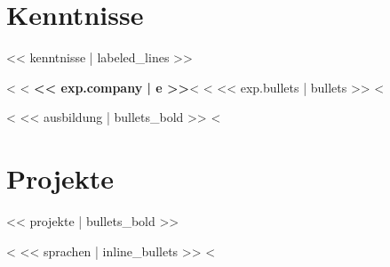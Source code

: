 \documentclass[10pt,a4paper]{article}
\begin{document}
\section*{Kenntnisse}
{\small << kenntnisse | labeled_lines >>}

<%
<%
{\bfseries << exp.company | e >>}<%
<%
\vspace{2pt}
<< exp.bullets | bullets >>
\vspace{2pt}
<%

<%
<< ausbildung | bullets_bold >>
<%

\section*{Projekte}
<< projekte | bullets_bold >>

<%
<< sprachen | inline_bullets >>
<%
\end{document}
